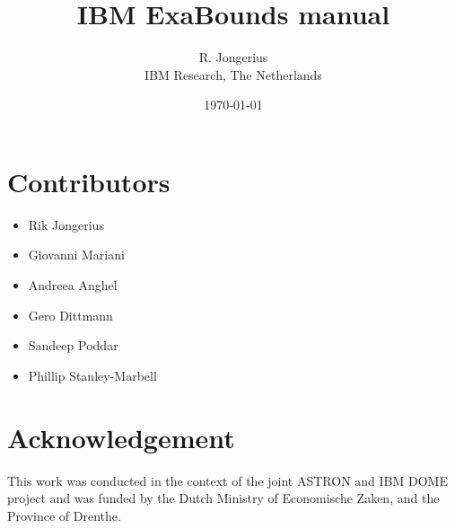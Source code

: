 \documentclass[a4paper, 10pt]{article}
\title{IBM ExaBounds manual}
\author{R. Jongerius\\IBM Research, The Netherlands}
\date{\today}
\begin{document}
\maketitle


\tableofcontents








\section{Contributors}
\begin{itemize}
  \item Rik Jongerius
  \item Giovanni Mariani
  \item Andreea Anghel
  \item Gero Dittmann
  \item Sandeep Poddar
  \item Phillip Stanley-Marbell
\end{itemize}

\section{Acknowledgement}
This work was conducted in the context of the joint ASTRON and IBM DOME
project and was funded by the Dutch Ministry of Economische Zaken, and the
Province of Drenthe.

\appendix






\end{document}
